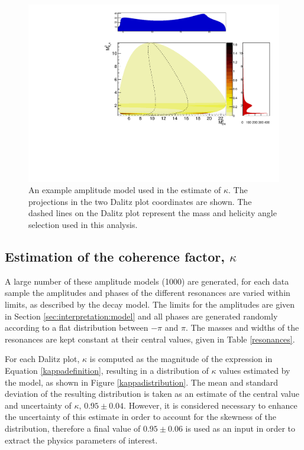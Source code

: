 \begin{figure}[h]
\centering
\includegraphics[width=0.8\linewidth]{figures/results/dalitz.pdf}
\caption{An example amplitude model used in the estimate of $\kappa$. The projections in the two Dalitz plot coordinates are shown. The dashed lines on the Dalitz plot represent the \Kstar mass and \KS helicity angle selection used in this analysis.}
\label{dalitzplot}
\end{figure}

\subsection{Estimation of the coherence factor, $\kappa$}
\label{sec:interpretation:kappa}

A large number of these amplitude models (1000) are generated, for each data sample the amplitudes and phases of the different resonances are varied within limits, as described by the decay model. The limits for the amplitudes are given in Section \ref{sec:interpretation:model} and all phases are generated randomly according to a flat distribution between $-\pi$ and $\pi$. The masses and widths of the resonances are kept constant at their central values, given in Table \ref{resonances}. 

For each Dalitz plot, $\kappa$ is computed as the magnitude of the expression in Equation \ref{kappadefinition}, resulting in a distribution of $\kappa$ values estimated by the model, as shown in Figure \ref{kappadistribution}. The mean and standard deviation of the resulting distribution is taken as an estimate of the central value and uncertainty of $\kappa$,  $0.95 \pm 0.04$. However, it is considered necessary to enhance the uncertainty of this estimate in order to account for the skewness of the distribution, therefore a final value of $0.95 \pm 0.06$ is used as an input in order to extract the physics parameters of interest.

